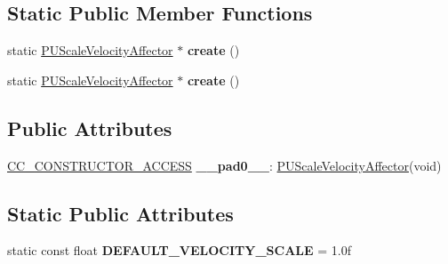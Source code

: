 \subsection*{Static Public Member Functions}
\begin{DoxyCompactItemize}
\item 
\mbox{\label{classPUScaleVelocityAffector_a959369fe22575bb93de0e3fdbb6b2cc9}} 
static \hyperlink{classPUScaleVelocityAffector}{P\+U\+Scale\+Velocity\+Affector} $\ast$ {\bfseries create} ()
\item 
\mbox{\label{classPUScaleVelocityAffector_a587bd996642332bb110caf6f0a0876c7}} 
static \hyperlink{classPUScaleVelocityAffector}{P\+U\+Scale\+Velocity\+Affector} $\ast$ {\bfseries create} ()
\end{DoxyCompactItemize}
\subsection*{Public Attributes}
\begin{DoxyCompactItemize}
\item 
\mbox{\label{classPUScaleVelocityAffector_ae49df4fc64d571d413f9e8d1626eb16e}} 
\hyperlink{_2cocos2d_2cocos_2base_2ccConfig_8h_a25ef1314f97c35a2ed3d029b0ead6da0}{C\+C\+\_\+\+C\+O\+N\+S\+T\+R\+U\+C\+T\+O\+R\+\_\+\+A\+C\+C\+E\+SS} {\bfseries \+\_\+\+\_\+pad0\+\_\+\+\_\+}\+: \hyperlink{classPUScaleVelocityAffector}{P\+U\+Scale\+Velocity\+Affector}(void)
\end{DoxyCompactItemize}
\subsection*{Static Public Attributes}
\begin{DoxyCompactItemize}
\item 
\mbox{\label{classPUScaleVelocityAffector_a15edf1952c3f1bc99ac6f7a57ae9b4ba}} 
static const float {\bfseries D\+E\+F\+A\+U\+L\+T\+\_\+\+V\+E\+L\+O\+C\+I\+T\+Y\+\_\+\+S\+C\+A\+LE} = 1.\+0f
\end{DoxyCompactItemize}
